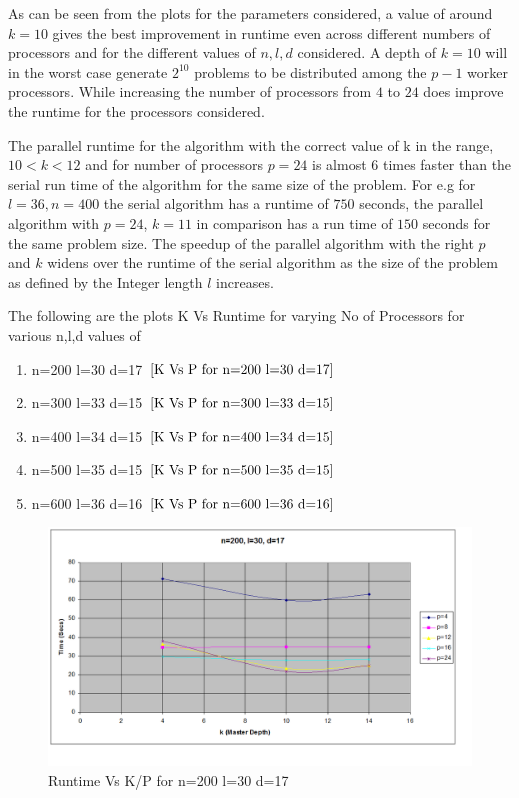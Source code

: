 \documentclass[twoside,11pt]{article}\usepackage{amsmath,amsfonts,amsthm,fullpage}
\begin{document}
As can be seen from the plots for the parameters considered, a value of around $k=10$ gives the best improvement in runtime even across different numbers of processors and for the different values of $n,l,d$ considered. A depth of $k=10$ will in the worst case generate $2^10$ problems to be distributed among the $p-1$ worker processors. While increasing the number of processors from $4$ to $24$ does improve the runtime for the processors considered.

The parallel runtime for the algorithm with the correct value of  k in the range, $10<k<12$ and for number of processors $p=24$ is almost 6 times faster than the serial run time of the algorithm for the same size of the problem. For e.g for $l=36,n=400$ the serial algorithm has a runtime of $750$ seconds, the parallel algorithm with $p=24$, $k=11$ in comparison has a run time of $150$ seconds for the same problem size. The speedup of the parallel algorithm with the right $p$ and $k$ widens over the runtime of the serial algorithm as the size of the problem as defined by the Integer length $l$ increases.

The following are the plots K Vs Runtime for varying No of Processors for various n,l,d values of 
\begin{enumerate}
\item
n=200 l=30 d=17 $\eqref{K Vs P for n=200 l=30 d=17}$
\item
n=300 l=33 d=15 $\eqref{K Vs P for n=300 l=33 d=15}$
\item
n=400 l=34 d=15 $\eqref{K Vs P for n=400 l=34 d=15}$
\item
n=500 l=35 d=15 $\eqref{K Vs P for n=500 l=35 d=15}$
\item
n=600 l=36 d=16 $\eqref{K Vs P for n=600 l=36 d=16}$
\end{enumerate}

\begin{figure}[!htbp]
\centering
\includegraphics[scale=.46]{images/nld_n=200-l=30-d=17} 
\caption{Runtime Vs K/P for n=200 l=30 d=17}
\label{K Vs P for n=200 l=30 d=17}
\end{figure}
\end{document}
